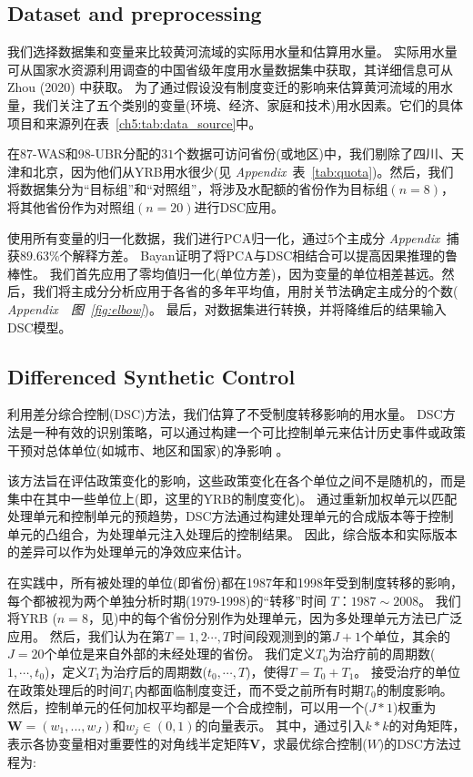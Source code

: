 \subsection{Dataset and preprocessing}\label{sec:dataset}

我们选择数据集和变量来比较黄河流域的实际用水量和估算用水量。
实际用水量可从国家水资源利用调查的中国省级年度用水量数据集中获取，其详细信息可从Zhou (2020) \cite{zhou2020}中获取。
为了通过假设没有制度变迁的影响来估算黄河流域的用水量，我们关注了五个类别的变量(环境、经济、家庭和技术)用水因素。它们的具体项目和来源列在表~\ref{ch5:tab:data_source}中。



在87-WAS和98-UBR分配的$31$个数据可访问省份(或地区)中，我们剔除了四川、天津和北京，因为他们从YRB用水很少(见\textit{ Appendix}~表~\ref{tab:quota})。然后，我们将数据集分为“目标组”和“对照组”，将涉及水配额的省份作为目标组$(n=8)$，将其他省份作为对照组$(n=20)$进行DSC应用。

使用所有变量的归一化数据，我们进行PCA归一化，通过$5$个主成分\textit{ Appendix~}捕获$89.63\%$个解释方差。
Bayan证明了将PCA与DSC相结合可以提高因果推理\cite{bayani2021}的鲁棒性。
我们首先应用了零均值归一化(单位方差)，因为变量的单位相差甚远。然后，我们将主成分分析应用于各省的多年平均值，用肘关节法确定主成分的个数(\textit{ Appendix~~图~\ref{fig:elbow}})。
最后，对数据集进行转换，并将降维后的结果输入DSC模型。

\subsection{Differenced Synthetic Control}\label{sec:DSC}

利用差分综合控制(DSC)方法，我们估算了不受制度转移影响的用水量。
DSC方法是一种有效的识别策略，可以通过构建一个可比控制单元来估计历史事件或政策干预对总体单位(如城市、地区和国家)的净影响 \cite{abadie2010, abadie2015, hill2021}。

该方法旨在评估政策变化的影响，这些政策变化在各个单位之间不是随机的，而是集中在其中一些单位上(即，这里的YRB的制度变化)。
通过重新加权单元以匹配处理单元和控制单元的预趋势，DSC方法通过构建处理单元的合成版本等于控制单元的凸组合，为处理单元注入处理后的控制结果。
因此，综合版本和实际版本的差异可以作为处理单元的净效应来估计。

在实践中，所有被处理的单位(即省份)都在1987年和1998年受到制度转移的影响，每个都被视为两个单独分析时期(1979-1998)的“转移”时间 $T$：$1987 \sim 2008$。
我们将YRB ($n=8$，见\textit{})中的每个省份分别作为处理单元，因为多处理单元方法已广泛应用\cite{abadie2021}。
然后，我们认为在第$T = {1,2 \cdots , T}$时间段观测到的第$J+1$个单位，其余的$J=20$个单位是来自外部的未经处理的省份。
我们定义$T_0$为治疗前的周期数($1,\cdots,t_0$)，定义$T_1$为治疗后的周期数($t_0,\cdots,T$)，使得$T = T_0+ T_1$。
接受治疗的单位在政策处理后的时间$T_1$内都面临制度变迁，而不受之前所有时期$T_0$的制度影响。
然后，控制单元的任何加权平均都是一个合成控制，可以用一个($J * 1$)权重为$\mathbf{W} = (w_{1},...,w_{J})$和$w_j \in (0, 1)$的向量表示。
其中，通过引入$k * k$的对角矩阵，表示各协变量相对重要性的对角线半定矩阵$\mathbf{V}$，求最优综合控制($W$)的DSC方法过程为:

